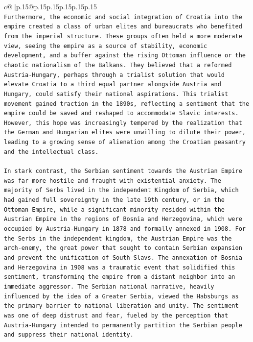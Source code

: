 \documentclass{article}
\begin{document}
{\begin{supertabular}{c@{$\;$}|p{.15\linewidth}@{}p{.15\linewidth}p{.15\linewidth}p{.15\linewidth}p{.15\linewidth}p{.15\linewidth}}
{{{\\ 
\texttt{Furthermore, the economic and social integration of Croatia into the empire created a class of urban elites and bureaucrats who benefited from the imperial structure. These groups often held a more moderate view, seeing the empire as a source of stability, economic development, and a buffer against the rising Ottoman influence or the chaotic nationalism of the Balkans. They believed that a reformed Austria{-}Hungary, perhaps through a trialist solution that would elevate Croatia to a third equal partner alongside Austria and Hungary, could satisfy their national aspirations. This trialist movement gained traction in the 1890s, reflecting a sentiment that the empire could be saved and reshaped to accommodate Slavic interests. However, this hope was increasingly tempered by the realization that the German and Hungarian elites were unwilling to dilute their power, leading to a growing sense of alienation among the Croatian peasantry and the intellectual class.} \\
\\ 
\texttt{In stark contrast, the Serbian sentiment towards the Austrian Empire was far more hostile and fraught with existential anxiety. The majority of Serbs lived in the independent Kingdom of Serbia, which had gained full sovereignty in the late 19th century, or in the Ottoman Empire, while a significant minority resided within the Austrian Empire in the regions of Bosnia and Herzegovina, which were occupied by Austria{-}Hungary in 1878 and formally annexed in 1908. For the Serbs in the independent kingdom, the Austrian Empire was the arch{-}enemy, the great power that sought to contain Serbian expansion and prevent the unification of South Slavs. The annexation of Bosnia and Herzegovina in 1908 was a traumatic event that solidified this sentiment, transforming the empire from a distant neighbor into an immediate aggressor. The Serbian national narrative, heavily influenced by the idea of a Greater Serbia, viewed the Habsburgs as the primary barrier to national liberation and unity. The sentiment was one of deep distrust and fear, fueled by the perception that Austria{-}Hungary intended to permanently partition the Serbian people and suppress their national identity.} \\
\\ 
}}}
\end{supertabular}}
\end{document}
